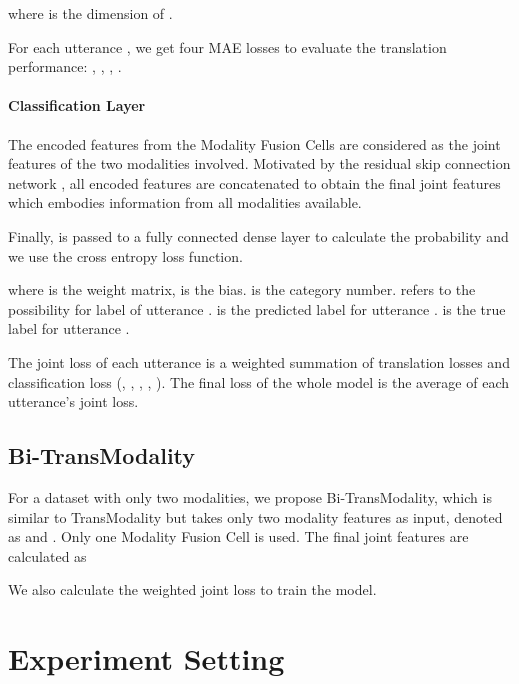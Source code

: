 \documentclass[sigconf]{acmart}
\begin{document}
	where  is the dimension of .
	
	For each utterance , we get four MAE losses to evaluate the translation performance: , , , .
	
	\paragraph{Classification Layer}
	The encoded features from the Modality Fusion Cells are considered as the joint features of the two modalities involved. Motivated by the residual skip connection network \cite{he2016deep}, all encoded features are concatenated to obtain the final joint features  which embodies information from all modalities available.
	
	
	Finally,  is passed to a fully connected dense layer to calculate the probability  and we use the cross entropy loss function.
	
	
	
	where  is the weight matrix,  is the bias.  is the category number.  refers to the possibility for label  of utterance .  is the predicted label for utterance .  is the true label for utterance .
	
	The joint loss of each utterance is a weighted summation of translation losses and classification loss (, , , , ). The final loss of the whole model is the average of each utterance's joint loss.
	
	\subsection{Bi-TransModality}
	For a dataset with only two modalities, we propose Bi-TransModality, which is similar to TransModality but takes only two modality features as input, denoted as  and . Only one Modality Fusion Cell is used. The final joint features are calculated as
	
	We also calculate the weighted joint loss to train the model.

	\section{Experiment Setting}
	
\end{document}

